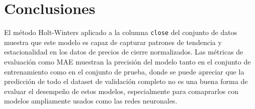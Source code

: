 \documentclass[
]{book}
\begin{document}
\section{Conclusiones}\label{conclusiones}

El método Holt-Winters aplicado a la columna \texttt{close} del conjunto de datos muestra que este modelo es capaz de capturar patrones de tendencia y estacionalidad en los datos de precios de cierre normalizados. Las métricas de evaluación como MAE muestran la precisión del modelo tanto en el conjunto de entrenamiento como en el conjunto de prueba, donde se puede apreciar que la predicción de todo el dataset de validación completo no es una buena forma de evaluar el desempeño de estos modelos, especialmente para comaprarlos con modelos ampliamente usados como las redes neuronales.

  
\end{document}
